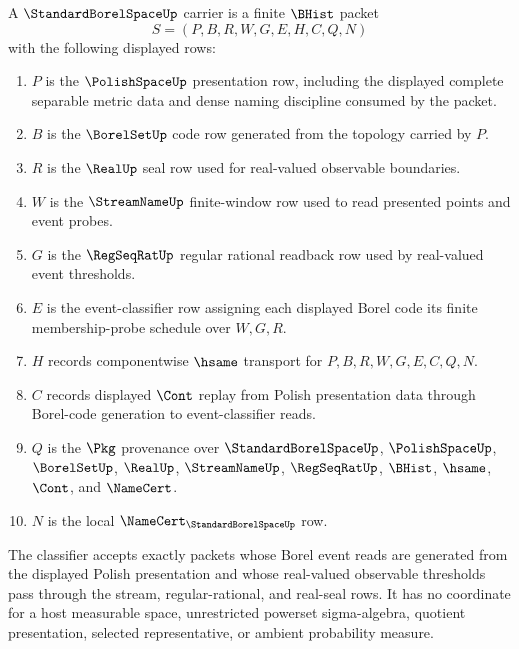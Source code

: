 \begin{definition}
\label{def:standard-borel-space-carrier}
A $\StandardBorelSpaceUp$ carrier is a finite $\BHist$ packet
$$
S=(P,B,R,W,G,E,H,C,Q,N)
$$
with the following displayed rows:
\begin{enumerate}
\item $P$ is the $\PolishSpaceUp$ presentation row, including the displayed complete separable metric data and dense naming discipline consumed by the packet.
\item $B$ is the $\BorelSetUp$ code row generated from the topology carried by $P$.
\item $R$ is the $\RealUp$ seal row used for real-valued observable boundaries.
\item $W$ is the $\StreamNameUp$ finite-window row used to read presented points and event probes.
\item $G$ is the $\RegSeqRatUp$ regular rational readback row used by real-valued event thresholds.
\item $E$ is the event-classifier row assigning each displayed Borel code its finite membership-probe schedule over $W,G,R$.
\item $H$ records componentwise $\hsame$ transport for $P,B,R,W,G,E,C,Q,N$.
\item $C$ records displayed $\Cont$ replay from Polish presentation data through Borel-code generation to event-classifier reads.
\item $Q$ is the $\Pkg$ provenance over $\StandardBorelSpaceUp$, $\PolishSpaceUp$, $\BorelSetUp$, $\RealUp$, $\StreamNameUp$, $\RegSeqRatUp$, $\BHist$, $\hsame$, $\Cont$, and $\NameCert$.
\item $N$ is the local $\NameCert_{\StandardBorelSpaceUp}$ row.
\end{enumerate}
The classifier accepts exactly packets whose Borel event reads are generated from the displayed Polish presentation and whose real-valued observable thresholds pass through the stream, regular-rational, and real-seal rows. It has no coordinate for a host measurable space, unrestricted powerset sigma-algebra, quotient presentation, selected representative, or ambient probability measure.
\end{definition}

